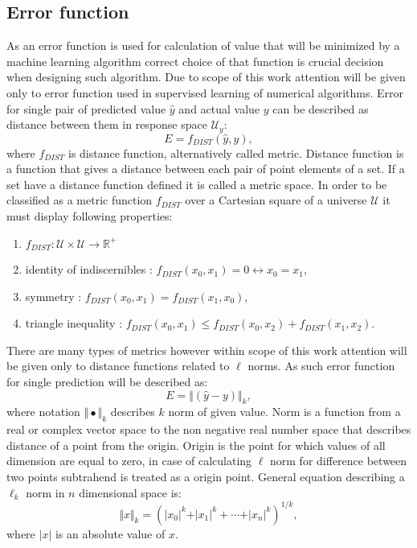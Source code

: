 \subsection{Error function}
As an error function is used for calculation of value that will be minimized by a machine 
learning algorithm correct choice of that function is crucial decision when designing such
algorithm.
Due to scope of this work attention will be given only to error function used in supervised 
learning of numerical algorithms.
Error for single pair of predicted value $\hat{y}$ and actual value $y$ can be described as
distance between them in response space $\mathcal{U}_{y}$:
\begin{equation}
	\label{equ:dist_general}
	E = f_{DIST}(\hat{y},y),
\end{equation}
where $f_{DIST}$ is distance function, alternatively called metric.
Distance function is a function that gives a distance between each pair of point elements of a set.
If a set have a distance function defined it is called a metric space. 
In order to be classified as a metric function $f_{DIST}$ over a Cartesian square of a universe 
$\mathcal{U}$ it must display following properties:
\begin{enumerate}
	\item $f_{DIST} : \mathcal{U} \times \mathcal{U} \to \mathbb{R}^{+}$
	\item identity of indiscernibles : $f_{DIST}(x_{0}, x_{1})=0 \leftrightarrow x_{0} = x_{1}$,
	\item symmetry : $f_{DIST}(x_{0},x_{1})=f_{DIST}(x_{1},x_{0})$,
	\item triangle inequality : $f_{DIST}(x_{0},x_{1}) \leq f_{DIST}(x_{0},x_{2}) +
		f_{DIST}(x_{1},x_{2})$. 
\end{enumerate}

There are many types of metrics however within scope of this work attention will be given only to
distance functions related to $\ell$ norms.
As such error function for single prediction will be described as: 
\begin{equation}
	\label{equ:dist_norm}
	E = \Vert (\hat{y}-y) \Vert_{k},
\end{equation}
where notation $\Vert \bullet \Vert_{k}$ describes $k$ norm of given value.
Norm is a function from a real or complex vector space to the non negative real number space
that describes distance of a point from the origin.
Origin is the point for which values of all dimension are equal to zero, in case of calculating
$\ell$ norm for difference between two points subtrahend is treated as a origin point.
General equation describing a $\ell_{k}$ norm in $n$ dimensional space is:
\begin{equation}
	\label{equ:ell_norm}
	\Vert x \Vert_{k} = (\vert x_{0} \vert^{k} + \vert x_{1} \vert^{k} + \cdots +
	\vert x_{n} \vert^{k})^{1/k},
\end{equation}
where $\vert x \vert$ is an absolute value of $x$.


